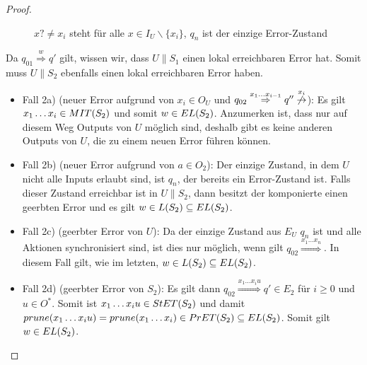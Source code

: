 \begin{proof}
\begin{itemize}
\begin{figure} [h!tbp]
\begin{center}
        \caption{$x?\neq x_i$ steht für alle $x\in I_U\backslash\{x_i\}$, $q_n$
          ist der einzige Error-Zustand}
        \label{UmitE}
      \end{center}
      \end{figure}
      Da $q_{01} \overset{w}{\Rightarrow} q'$ gilt, wissen wir, dass $U\|S_1$
      einen lokal erreichbaren Error hat. Somit muss $U\|S_2$ ebenfalls einen
      lokal erreichbaren Error haben.
      \begin{itemize}
        \item Fall 2a) (neuer Error aufgrund von $x_i\in O_U$ und $q_{02}
          \overset{x_1\dots x_{i-1}}{\Rightarrow} q''
          \overset{x_i}{\not{\hspace{-0.1cm}\rightarrow}}$): Es gilt $x_1\dots
          x_i\in MIT{}(S_2)$ und somit $w\in EL{}(S_2)$. Anzumerken ist, dass nur
          auf diesem Weg Outputs von $U$ möglich sind, deshalb gibt es keine
          anderen Outputs von $U$, die zu einem neuen Error führen können.
        \item Fall 2b) (neuer Error aufgrund von $a\in O_2$): Der einzige
          Zustand, in dem $U$ nicht alle Inputs erlaubt sind, ist $q_n$, der
          bereits ein Error-Zustand ist. Falls dieser Zustand erreichbar ist in
          $U\|S_2$, dann besitzt der komponierte \EIO{} einen geerbten Error und
          es gilt $w\in L(S_2)\subseteq EL{}(S_2)$.
        \item Fall 2c) (geerbter Error von $U$): Da der einzige Zustand aus
          $E_U$ $q_n$ ist und alle Aktionen synchronisiert sind, ist dies nur
          möglich, wenn gilt $q_{02} \overset{x_1\dots x_n}{\Rightarrow}$. In
          diesem Fall gilt, wie im letzten, $w\in L(S_2)\subseteq EL{}(S_2)$.
        \item Fall 2d) (geerbter Error von $S_2$): Es gilt dann $q_{02}
          \overset{x_1\dots x_iu}{\Rightarrow} q'\in E_2$ für $i\geq 0$ und
          $u\in O^*$. Somit ist $x_1\dots x_iu\in StET{}(S_2)$ und damit
          $prune{}(x_1\dots x_iu)=prune{}(x_1\dots x_i)\in PrET{}(S_2)\subseteq
          EL{}(S_2)$. Somit gilt $w\in EL{}(S_2)$.
      \end{itemize}
  \end{itemize}
\end{proof}

